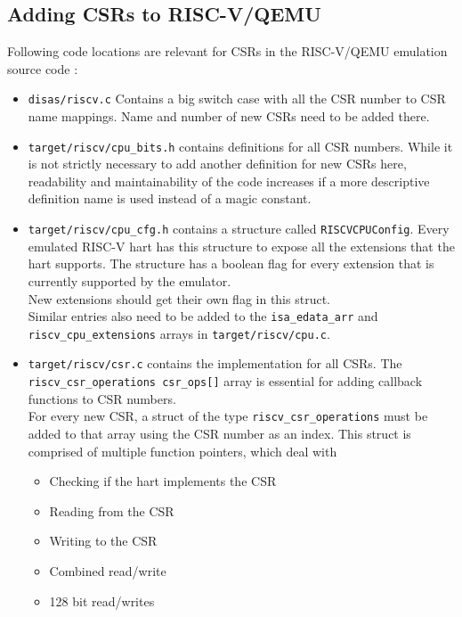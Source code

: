 

\subsection{Adding CSRs to RISC-V/QEMU}

Following code locations are relevant for CSRs in the RISC-V/QEMU emulation source code \cite{QEMUSource2024}:
\begin{itemize}
    \item \texttt{disas/riscv.c} Contains a big switch case with all the CSR number to CSR name mappings.
          Name and number of new CSRs need to be added there.
    \item \texttt{target/riscv/cpu\_bits.h} contains definitions for all CSR numbers.
          While it is not strictly necessary to add another definition for new CSRs here, readability and maintainability
          of the code increases if a more descriptive definition name is used instead of a magic constant.
    \item \texttt{target/riscv/cpu\_cfg.h} contains a structure called \texttt{RISCVCPUConfig}. Every emulated RISC-V hart
          has this structure to expose all the extensions that the hart supports. 
          The structure has a boolean flag for every extension that is currently supported by the emulator.\\
          New extensions should get their own flag in this struct.\\
          Similar entries also need to be added to the \texttt{isa\_edata\_arr} and \texttt{riscv\_cpu\_extensions} arrays in \texttt{target/riscv/cpu.c}.
    \item \texttt{target/riscv/csr.c} contains the implementation for all CSRs. The \texttt{riscv\_csr\_operations csr\_ops[]}
          array is essential for adding callback functions to CSR numbers.\\
          For every new CSR, a struct of the type \texttt{riscv\_csr\_operations} must be added to that array using the
          CSR number as an index. This struct is comprised of multiple function pointers, which deal with
          \begin{itemize}
              \item Checking if the hart implements the CSR
              \item Reading from the CSR
              \item Writing to the CSR
              \item Combined read/write
              \item 128 bit read/writes
          \end{itemize}
\end{itemize}

